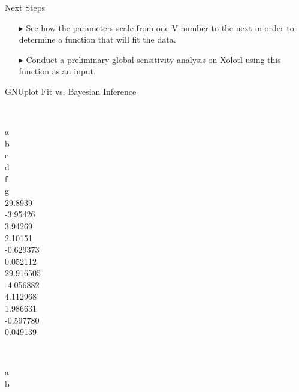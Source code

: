 \documentclass[10pt]{beamer}
\begin{document}
\begin{frame}{Next Steps}
	\Large
    \begin{itemize}
    	\item[$\blacktriangleright$] See how the parameters scale from one V number
    	to the next in order to determine a function that will fit the data.
    	\newline
    	
    	\item[$\blacktriangleright$] Conduct a preliminary global sensitivity
    	analysis on Xolotl using this function as an input.
    \end{itemize}
\end{frame}

\begin{frame}{GNUplot Fit vs. Bayesian Inference}
	\vspace{-3mm}
	\begin{columns}[c]
		 \\
		a \\
		b \\
		c \\
		d \\
		f \\
		g 
		 \\
		29.8939 \\
		-3.95426 \\
		3.94269 \\
		2.10151 \\
		-0.629373 \\
		0.052112 
		 \\
		29.916505 \\
		-4.056882 \\
		4.112968 \\
		1.986631 \\
		-0.597780 \\
		0.049139
	\end{columns}
	\newline
	\newline
	\vspace{4mm}
	\vspace{-1mm}
	\begin{columns}[c]
 		 \\
		a \\
		b \\

\end{columns}
\end{frame}
\end{document}
